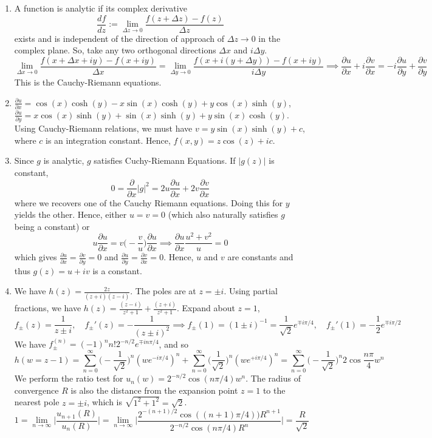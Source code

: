 \documentclass[a4paper]{article}
\begin{document}
\begin{ans}\leavevmode
\begin{enumerate}[label=(\alph*)]
\item A function is analytic if its complex derivative
$$\frac{df}{dz}:=\lim_{\Delta z\rightarrow0}\frac{f(z+\Delta z)-f(z)}{\Delta z}$$
exists and is independent of the direction of approach of $\Delta z\rightarrow0$ in the complex plane. So, take any two orthogonal directions $\Delta x$ and $i\Delta y$.
$$\lim_{\Delta x\rightarrow0}\frac{f(x+\Delta x+iy)-f(x+iy)}{\Delta x}=\lim_{\Delta y\rightarrow0}\frac{f(x+i(y+\Delta y))-f(x+iy)}{i\Delta y}\implies\frac{\partial u}{\partial x}+i\frac{\partial v}{\partial x}=-i\frac{\partial u}{\partial y}+\frac{\partial v}{\partial y}$$
This is the Cauchy-Riemann equations.
\item $\frac{\partial u}{\partial x}=\cos(x)\cosh(y)-x\sin(x)\cosh(y)+y\cos(x)\sinh(y)$, $\frac{\partial u}{\partial y}=x\cos(x)\sinh(y)+\sin(x)\sinh(y)+y\sin(x)\cosh(y)$. Using Cauchy-Riemann relations, we must have $v=y\sin(x)\sinh(y)+c$, where $c$ is an integration constant. Hence, $f(x,y)=z\cos(z)+ic$.
\item Since $g$ is analytic, $g$ satisfies Cuchy-Riemann Equations. If $|g(z)|$ is constant,
$$0=\frac{\partial}{\partial x}|g|^2=2u\frac{\partial u}{\partial x}+2v\frac{\partial v}{\partial x}$$
where we recovers one of the Cauchy Riemann equations. Doing this for $y$ yields the other. Hence, either $u=v=0$ (which also naturally satisfies $g$ being a constant) or
$$u\frac{\partial u}{\partial x}=v\bigg(-\frac{v}{u}\bigg)\frac{\partial u}{\partial x}\implies\frac{\partial u}{\partial x}\frac{u^2+v^2}{u}=0$$
which gives $\frac{\partial u}{\partial x}=\frac{\partial v}{\partial y}=0$ and $\frac{\partial u}{\partial y}=\frac{\partial v}{\partial x}=0$. Hence, $u$ and $v$ are constants and thus $g(z)=u+iv$ is a constant.
\item We have $h(z)=\frac{2z}{(z+i)(z-i)}$. The poles are at $z=\pm i$. Using partial fractions, we have
$h(z)=\frac{(z-i)}{z^2+1}+\frac{(z+i)}{z^2+1}$.
Expand about $z=1$,
$$f_{\pm}(z)=\frac{1}{z\pm i},\quad f_\pm'(z)=-\frac{1}{(z\pm i)^2}\implies f_\pm(1)=(1\pm i)^{-1}=\frac{1}{\sqrt{2}}e^{\mp i\pi/4},\quad  f_\pm'(1)=-\frac{1}{2}e^{\mp i\pi/2}$$
We have $f_\pm^{(n)}=(-1)^nn!2^{-n/2}e^{\mp in\pi/4}$, and so
$$h(w=z-1)=\sum_{n=0}^\infty\bigg(-\frac{1}{\sqrt{2}}\bigg)^n(we^{-i\pi/4})^n+\sum_{n=0}^\infty\bigg(\frac{1}{\sqrt{2}}\bigg)^n(we^{+i\pi/4})^n=\sum_{n=0}^\infty\bigg(-\frac{1}{\sqrt{2}}\bigg)^n2\cos\frac{n\pi}{4}w^n$$
We perform the ratio test for $u_n(w)=2^{-n/2}\cos(n\pi/4)w^n$. The radius of convergence $R$ is also the distance from the expansion point $z=1$ to the nearest pole $z=\pm i$, which is $\sqrt{1^2+1^2}=\sqrt{2}$.
$$1=\lim_{n\rightarrow\infty}\bigg|\frac{u_{n+1}(R)}{u_n(R)}\bigg|=\lim_{n\rightarrow\infty}\bigg|\frac{2^{-(n+1)/2}\cos((n+1)\pi/4))R^{n+1}}{2^{-n/2}\cos(n\pi/4)R^n}\bigg|=\frac{R}{\sqrt{2}}$$
\end{enumerate}
\end{ans}
\end{document}
